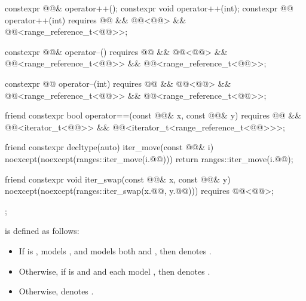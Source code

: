 \begin{codeblock}
{{    constexpr @@& operator++();
    constexpr void operator++(int);
    constexpr @@ operator++(int)
      requires @@ && @@<@@> &&
               @@<range_reference_t<@@>>;

    constexpr @@& operator--()
      requires @@ && @@<@@> &&
               @@<range_reference_t<@@>> &&
               @@<range_reference_t<@@>>;

    constexpr @@ operator--(int)
      requires @@ && @@<@@> &&
               @@<range_reference_t<@@>> &&
               @@<range_reference_t<@@>>;

    friend constexpr bool operator==(const @@& x, const @@& y)
      requires @@ && @@<iterator_t<@@>> &&
               @@<iterator_t<range_reference_t<@@>>>;

    friend constexpr decltype(auto) iter_move(const @@& i)
    noexcept(noexcept(ranges::iter_move(i.@@))) {
      return ranges::iter_move(i.@@);
    }

    friend constexpr void iter_swap(const @@& x, const @@& y)
      noexcept(noexcept(ranges::iter_swap(x.@@, y.@@)))
      requires @@<@@>;
  };
}
\end{codeblock}

\pnum
{} is defined as follows:
\begin{itemize}
\item If  is ,
   models , and
   models
  both  and ,
  then  denotes .
\item Otherwise, if  is  and
   and 
  each model , then  denotes
  .
\item Otherwise,  denotes .
\end{itemize}

